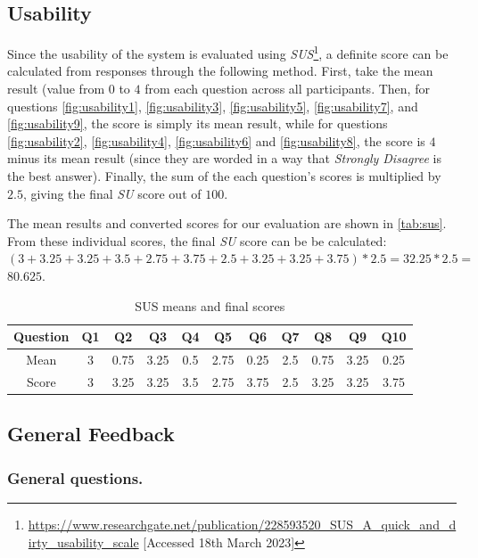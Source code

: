\documentclass{l4proj}
\begin{document}
\subsection{Usability}
Since the usability of the system is evaluated using \emph{SUS}\footnote{\url{https://www.researchgate.net/publication/228593520_SUS_A_quick_and_dirty_usability_scale} [Accessed 18th March 2023]}, a definite score can be calculated from responses through the following method. First, take the mean result (value from $0$ to $4$ from each question across all participants. Then, for questions \autoref{fig:usability1}, \autoref{fig:usability3}, \autoref{fig:usability5}, \autoref{fig:usability7}, and \autoref{fig:usability9}, the score is simply its mean result, while for questions \autoref{fig:usability2}, \autoref{fig:usability4}, \autoref{fig:usability6} and \autoref{fig:usability8}, the score is $4$ minus its mean result (since they are worded in a way that \emph{Strongly Disagree} is the best answer). Finally, the sum of the each question's scores is multiplied by $2.5$, giving the final \emph{SU} score out of $100$.

The mean results and converted scores for our evaluation are shown in \autoref{tab:sus}. From these individual scores, the final \emph{SU} score can be be calculated: $(3 + 3.25 + 3.25 + 3.5 + 2.75 + 3.75 + 2.5 + 3.25 + 3.25 + 3.75) * 2.5 = 32.25 * 2.5 =$ \textbf{$80.625$}.

\begin{table}[h]
\begin{center}
\begin{tabular}{| c || c | c | c | c | c | c | c | c | c | c |}
	\hline
	Question & Q1 & Q2 & Q3 & Q4 & Q5 & Q6 & Q7 & Q8 & Q9 & Q10 \\
	\hline
	\hline
	Mean & 3 & 0.75 & 3.25 & 0.5 & 2.75 & 0.25 & 2.5 & 0.75 & 3.25 & 0.25 \\
	\hline
	Score & 3 & 3.25 & 3.25 & 3.5 & 2.75 & 3.75 & 2.5 & 3.25 & 3.25 & 3.75 \\
	\hline
\end{tabular}
\caption{\label{tab:sus}SUS means and final scores}
\end{center}
\end{table}

\subsection{General Feedback}

\subsubsection{General questions.}
\label{sec:personal_questions}
\end{document}
